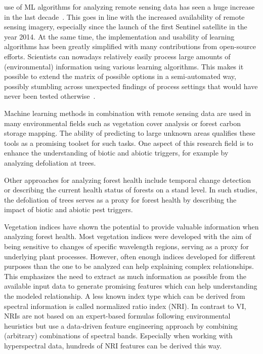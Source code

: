 \documentclass[letterpaper, peerreview]{IEEEtran}
\begin{document}
 use of \ac{ML} algorithms for analyzing remote sensing data has seen a huge increase in the last decade~\cite{lary2016}.
This goes in line with the increased availability of remote sensing imagery, especially since the launch of the first Sentinel satellite in the year 2014.
At the same time, the implementation and usability of learning algorithms has been greatly simplified with many contributions from open-source efforts.
Scientists can nowadays relatively easily process large amounts of (environmental) information using various learning algorithms.
This makes it possible to extend the matrix of possible options in a semi-automated way, possibly stumbling across unexpected findings of process settings that would have never been tested otherwise~\cite{ma2015}.


Machine learning methods in combination with remote sensing data are used in many environmental fields such as vegetation cover analysis or forest carbon storage mapping\cite{mascaro2014, urban2018}.
The ability of predicting to large unknown areas qualifies these tools as a promising toolset for such tasks.
One aspect of this research field is to enhance the understanding of biotic and abiotic triggers, for example by analyzing defoliation at trees\cite{hawrylo2018}.

Other approaches for analyzing forest health include temporal change detection\cite{zhang2016} or describing the current health status of forests on a stand level\cite{townsend2012}.
In such studies, the defoliation of trees serves as a proxy for forest health by describing the impact of biotic and abiotic pest triggers\cite{townsend2012, goodbody2018}.

Vegetation indices have shown the potential to provide valuable information when analyzing forest health\cite{jiang2014, adamczyk2015}.
Most vegetation indices were developed with the aim of being sensitive to changes of specific wavelength regions, serving as a proxy for underlying plant processes. 
However, often enough indices developed for different purposes than the one to be analyzed can help explaining complex relationships.
This emphasizes the need to extract as much information as possible from the available input data to generate promising features which can help understanding the modeled relationship.
A less known index type which can be derived from spectral information is called normalized ratio index (NRI).
In contrast to \ac{VI}, \ac{NRI}s are not based on an expert-based formulas following environmental heuristics but use a data-driven feature engineering approach by combining (arbitrary) combinations of spectral bands.
Especially when working with hyperspectral data, hundreds of \ac{NRI} features can be derived this way.
\end{document}
